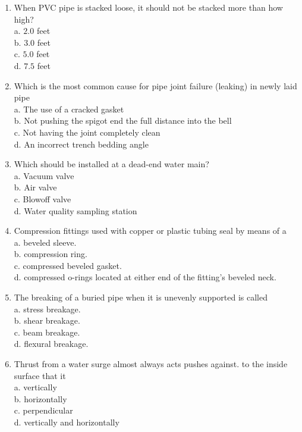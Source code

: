 \documentclass[10pt]{article}
\begin{document}
\begin{enumerate}
  \item When PVC pipe is stacked loose, it should not be stacked more than how high?\\
a. $2.0$ feet\\
b. $3.0$ feet\\
c. $5.0$ feet\\
d. $7.5$ feet

  \item Which is the most common cause for pipe joint failure (leaking) in newly laid pipe\\
a. The use of a cracked gasket\\
b. Not pushing the spigot end the full distance into the bell\\
c. Not having the joint completely clean\\
d. An incorrect trench bedding angle

  \item Which should be installed at a dead-end water main?\\
a. Vacuum valve\\
b. Air valve\\
c. Blowoff valve\\
d. Water quality sampling station

  \item Compression fittings used with copper or plastic tubing seal by means of a\\
a. beveled sleeve.\\
b. compression ring.\\
c. compressed beveled gasket.\\
d. compressed o-rings located at either end of the fitting's beveled neck. 

  \item The breaking of a buried pipe when it is unevenly supported is called\\
a. stress breakage.\\
b. shear breakage.\\
c. beam breakage.\\
d. flexural breakage.

  \item Thrust from a water surge almost always acts pushes against. to the inside surface that it\\
a. vertically\\
b. horizontally\\
c. perpendicular\\
d. vertically and horizontally


\end{enumerate}
\end{document}
